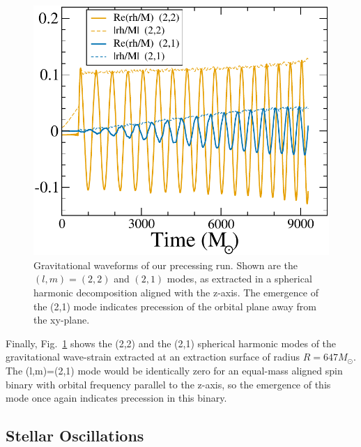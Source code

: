 {\begin{figure}
\includegraphics[width=0.9\columnwidth]{chap2/PrecGW}
\caption[Gravitational waveforms of our precessing run.]{\label{fig:PrecGW} Gravitational waveforms of our precessing
  run.  Shown are the $(l,m)=(2,2)$ and $(2,1)$ modes, as extracted in
  a spherical harmonic decomposition aligned with the z-axis.  The
  emergence of the (2,1) mode indicates precession of the orbital
  plane away from the xy-plane.}
\end{figure}


Finally, Fig.~\ref{fig:PrecGW} shows the (2,2) and the (2,1) spherical
harmonic modes of the gravitational wave-strain extracted at an
extraction surface of radius $R=647M_\odot$.  The
(l,m)=(2,1) mode would be identically zero for an equal-mass aligned
spin binary with orbital frequency parallel to the z-axis, so the
emergence of this mode once again indicates precession in this binary.




\subsection{Stellar Oscillations}
\label{sec:QNModes}

}
